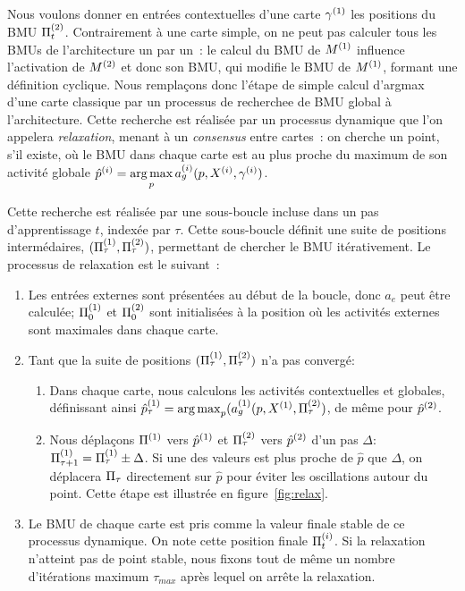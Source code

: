 \documentclass[../main]{subfiles}
\begin{document}
Nous voulons donner en entrées contextuelles d'une carte $\gamma^{({1})}$ les positions du BMU $\Pi^{({2})}_t$.
Contrairement à une carte simple, on ne peut pas calculer tous les BMUs de l'architecture un par un~: le calcul du BMU de $M^{({1})}$ influence l'activation de $M^{({2})}$ et donc son BMU, qui modifie le BMU de $M^{({1})}$, formant une définition cyclique.
Nous remplaçons donc l'étape de simple calcul d'argmax d'une carte classique par un processus de recherchee de BMU global à l'architecture. Cette recherche est réalisée par un processus dynamique que l'on appelera \emph{relaxation}, menant à un \emph{consensus} entre cartes~: on cherche un point, s'il existe, où le BMU dans chaque carte est au plus proche du maximum de son activité globale $\hat{p}^{({i})} = \operatorname*{arg\,max}\limits_p a_g^{({i})}(p, X^{({i})}, \gamma^{({i})})$.

Cette recherche est réalisée par une sous-boucle incluse dans un pas d'apprentissage $t$, indexée par $\tau$. Cette sous-boucle définit une suite de positions intermédaires, $(\Pi^{({1})}_\tau , \Pi^{({2})}_\tau)$, permettant de chercher le BMU itérativement.
Le processus de relaxation est le suivant~:
\begin{enumerate}
\item Les entrées externes sont présentées au début de la boucle, donc $a_e$ peut être calculée; $\Pi^{({1})}_0$ et $\Pi^{({2})}_0$ sont initialisées à la position où les activités externes sont maximales dans chaque carte. 
\item Tant que la suite de positions $(\Pi^{({1})}_\tau,\Pi^{({2})}_\tau)$ n'a pas convergé:
	\begin{enumerate}
	\item Dans chaque carte, nous calculons les activités contextuelles et globales, définissant ainsi $\hat{p}^{({1})}_\tau = \operatorname*{arg\,max}_p(a_g^{({1})}(p,X^{({1})}, \Pi^{({2})}_\tau)$, de même pour $\hat{p}^{({2})}$.
	\item Nous déplaçons $\Pi^{({1})}$ vers $\hat{p}^{({1})}$ et $\Pi^{({2})}_\tau$ vers $\hat{p}^{({2})}$ d'un pas $\Delta$: $\Pi^{({1})}_{\tau+1} = \Pi^{({1})}_{\tau} \pm \Delta$.
	Si une des valeurs est plus proche de $\hat{p}$ que $\Delta$, on déplacera $\Pi_\tau$ directement sur $\hat{p}$ pour éviter les oscillations autour du point. Cette étape est illustrée en figure~\ref{fig:relax}.
	\end{enumerate}
\item Le BMU de chaque carte est pris comme la valeur finale stable de ce processus dynamique. On note cette position finale $\Pi^{({i})}_t$.
Si la relaxation n'atteint pas de point stable, nous fixons tout de même un nombre d'itérations maximum $\tau_{max}$ après lequel on arrête la relaxation.
\end{enumerate}
\end{document}
